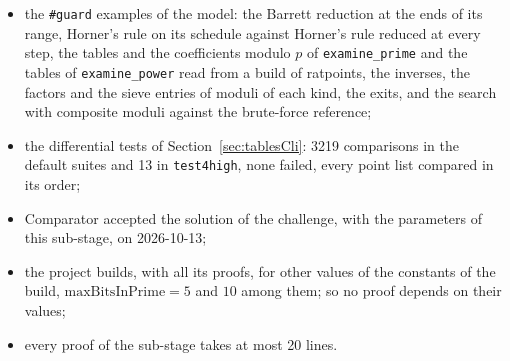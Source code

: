 \begin{itemize}
    project (54 findings, 47 confirmed), applied in twelve rounds, among them the lemma on sorted
    lists in the currency of Mathlib, the shared facts as lemmas of their own, conjunctions split
    and unused lemmas removed, and the tables and the sieve entries in a module of their own;
  \item the \verb|#guard| examples of the model: the Barrett reduction at the ends of its range,
    Horner's rule on its schedule against Horner's rule reduced at every step, the tables and the
    coefficients modulo $p$ of \verb|examine_prime| and the tables of \verb|examine_power| read from
    a build of ratpoints, the inverses, the factors and the sieve entries of moduli of each kind,
    the exits, and the search with composite moduli against the brute-force reference;
  \item the differential tests of Section~\ref{sec:tablesCli}: 3219 comparisons in the default
    suites and 13 in \verb|test4high|, none failed, every point list compared in its order;
  \item Comparator accepted the solution of the challenge, with the parameters of this sub-stage, on
    2026-10-13;
  \item the project builds, with all its proofs, for other values of the constants of the build,
    $\mathrm{maxBitsInPrime} = 5$ and $10$ among them; so no proof depends on their values;
  \item every proof of the sub-stage takes at most 20 lines.
\end{itemize}
